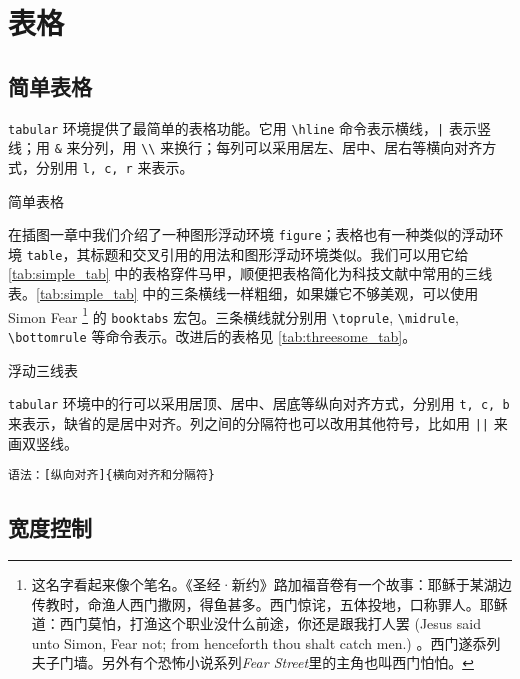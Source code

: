 \chapter{表格}

\section{简单表格}

\texttt{tabular} 环境提供了最简单的表格功能。它用 \verb|\hline| 命令表示横线，\verb+|+ 表示竖线；用 \verb|&| 来分列，用 \verb|\\| 来换行；每列可以采用居左、居中、居右等横向对齐方式，分别用 \texttt{l, c, r} 来表示。

\begin{example}[htbp]
\caption{简单表格}
\label{tab:simple_tab}
\end{example}


在插图一章中我们介绍了一种图形浮动环境 \texttt{figure}；表格也有一种类似的浮动环境 \texttt{table}，其标题和交叉引用的用法和图形浮动环境类似。我们可以用它给 \autoref{tab:simple_tab} 中的表格穿件马甲，顺便把表格简化为科技文献中常用的三线表。\autoref{tab:simple_tab} 中的三条横线一样粗细，如果嫌它不够美观，可以使用 Simon Fear\indexFear{} \footnote{这名字看起来像个笔名。《圣经·新约》路加福音卷有一个故事：耶稣于某湖边传教时，命渔人西门撒网，得鱼甚多。西门惊诧，五体投地，口称罪人。耶稣道：西门莫怕，打渔这个职业没什么前途，你还是跟我打人罢 (Jesus said unto Simon, Fear not; from henceforth thou shalt catch men.) 。西门遂忝列夫子门墙。另外有个恐怖小说系列\emph{Fear Street}里的主角也叫西门怕怕。} 的 \texttt{booktabs} 宏包\citep{Fear_booktabs}。三条横线就分别用 \verb|\toprule|, \verb|\midrule|, \verb|\bottomrule| 等命令表示。改进后的表格见 \autoref{tab:threesome_tab}。

\begin{example}[htbp]
\caption{浮动三线表}
\label{tab:threesome_tab}
\end{example}

\texttt{tabular} 环境中的行可以采用居顶、居中、居底等纵向对齐方式，分别用 \texttt{t, c, b} 来表示，缺省的是居中对齐。列之间的分隔符也可以改用其他符号，比如用 \verb+||+ 来画双竖线。

\verb|语法：[纵向对齐]{横向对齐和分隔符}|

\section{宽度控制}

